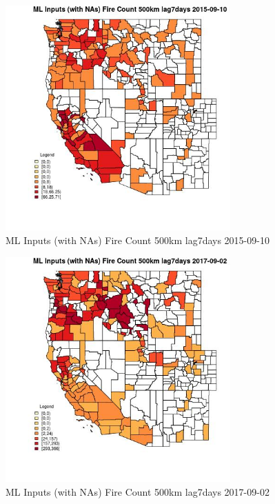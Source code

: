 \begin{figure} 
\centering  
\includegraphics[width=0.77\textwidth]{Code_Outputs/Report_ML_input_PM25_Step4_part_e_de_duplicated_aves_compiled_2019-05-20wNAs_CountyFire_Count_500km_lag7daysMean2015-09-10.jpg} 
\caption{\label{fig:Report_ML_input_PM25_Step4_part_e_de_duplicated_aves_compiled_2019-05-20wNAsCountyFire_Count_500km_lag7daysMean2015-09-10}ML Inputs (with NAs) Fire Count 500km lag7days 2015-09-10} 
\end{figure} 
 

\begin{figure} 
\centering  
\includegraphics[width=0.77\textwidth]{Code_Outputs/Report_ML_input_PM25_Step4_part_e_de_duplicated_aves_compiled_2019-05-20wNAs_CountyFire_Count_500km_lag7daysMean2017-09-02.jpg} 
\caption{\label{fig:Report_ML_input_PM25_Step4_part_e_de_duplicated_aves_compiled_2019-05-20wNAsCountyFire_Count_500km_lag7daysMean2017-09-02}ML Inputs (with NAs) Fire Count 500km lag7days 2017-09-02} 
\end{figure} 
 

